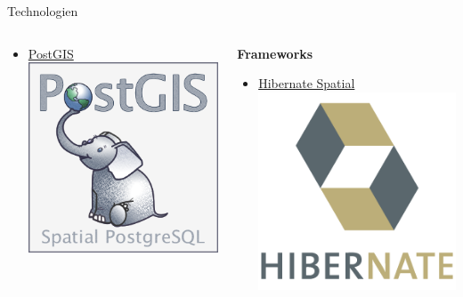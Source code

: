 \documentclass[ucs,9pt]{beamer}
\begin{document}
\begin{frame}{Technologien}
\begin{columns}[c]
\begin{column}[T]{0.49\textwidth}
\begin{itemize}
				\item \href{http://postgis.net/}{PostGIS} \includegraphics[scale=0.08]{postgislogo.png}
			\end{itemize}
		\end{column}
		\begin{column}[T]{0.49\textwidth} %
			\textbf{Frameworks}
			\begin{itemize}
				\item \href{http://www.hibernatespatial.org/}{Hibernate Spatial} \includegraphics[scale=0.08]{hibernatelogo.png}

\end{itemize}
\end{column}
\end{columns}
\end{frame}
\end{document}
